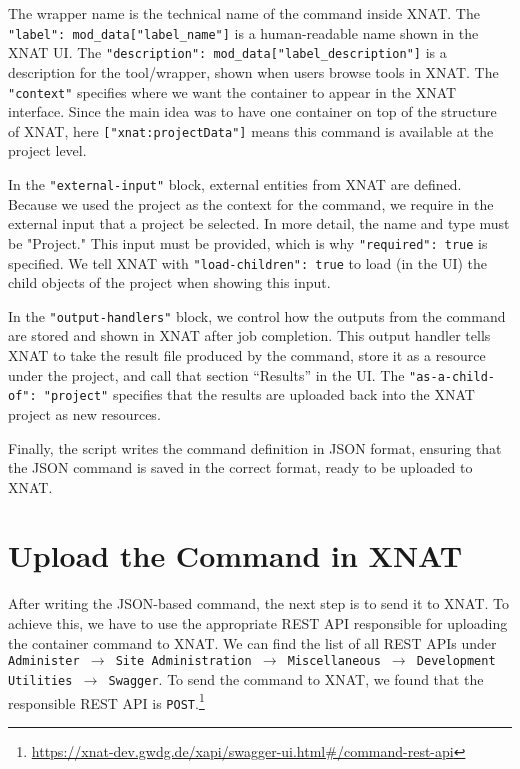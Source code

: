 The wrapper name is the technical name of the command inside XNAT. The \texttt{"label": mod\_data["label\_name"]} is a human-readable name shown in the XNAT \ac{UI}. The \texttt{"description": mod\_data["label\_description"]} is a description for the tool/wrapper, shown when users browse tools in XNAT. The \texttt{"context"} specifies where we want the container to appear in the XNAT interface. Since the main idea was to have one container on top of the structure of XNAT, here \texttt{["xnat:projectData"]} means this command is available at the project level.


In the \texttt{"external-input"} block, external entities from XNAT are defined. Because we used the project as the context for the command, we require in the external input that a project be selected. In more detail, the name and type must be "Project." This input must be provided, which is why \texttt{"required": true} is specified. We tell XNAT with \texttt{"load-children": true} to load (in the UI) the child objects of the project when showing this input.

In the \texttt{"output-handlers"} block, we control how the outputs from the command are stored and shown in XNAT after job completion. This output handler tells XNAT to take the result file produced by the command, store it as a resource under the project, and call that section ``Results'' in the UI. The \texttt{"as-a-child-of": "project"} specifies that the results are uploaded back into the XNAT project as new resources.

Finally, the script writes the command definition in JSON format, ensuring that the JSON command is saved in the correct format, ready to be uploaded to XNAT.

\section{Upload the Command in XNAT}

After writing the JSON-based command, the next step is to send it to XNAT. To achieve this, we have to use the appropriate REST API responsible for uploading the container command to XNAT.
We can find the list of all REST APIs under \texttt{Administer $\rightarrow$ Site Administration $\rightarrow$ Miscellaneous $\rightarrow$ Development Utilities $\rightarrow$ Swagger}.
To send the command to XNAT, we found that the responsible REST API is \texttt{POST}.\footnote{\url{https://xnat-dev.gwdg.de/xapi/swagger-ui.html\#/command-rest-api}}

